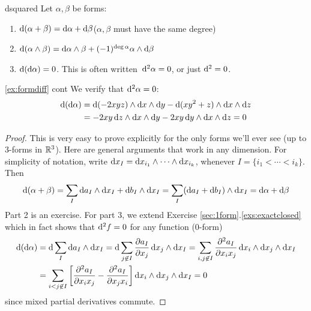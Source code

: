 \begin{thm}{}{dsquared}
	Let $\alpha,\beta$ be forms:
	\begin{enumerate}
	  \item $\D(\alpha+\beta)=\D\alpha+\D\beta$\quad ($\alpha,\beta$ must have the same degree)
	  \item $\D(\alpha\wedge\beta)=\D\alpha\wedge\beta+(-1)^{\deg\alpha}\alpha\wedge\D\beta$
	  \item $\D(\D\alpha)=0$. This is often written\footnotemark\  $\D^2\alpha=0$, or just $\D^2=0$.
	\end{enumerate}
\end{thm}



\goodbreak

\begin{example*}{\ref*{ex:formdiff} cont}{}
	We verify that $\D^2\alpha=0$:
	\begin{align*}
		\D(\D\alpha)&=\D(-2xyz)\wedge\dx\wedge\dy -\D(xy^2+z)\wedge\dx\wedge\dz\\
		&=-2xy\,\dz\wedge\dx\wedge\dy -2xy\,\dy\wedge\dx\wedge\dz =0
	\end{align*}
\end{example*}

\begin{proof}
	This is very easy to prove explicitly for the only forms we'll ever see (up to 3-forms in $\R^3$). Here are general arguments that work in any dimension.\smallbreak
	For simplicity of notation, write $\dx_I=\dx_{i_1}\wedge\dots\wedge\dx_{i_k}$, whenever $I=\{i_1<\cdots<i_k\}$. Then
	\[
		\D(\alpha+\beta)=\sum_I\D a_I\wedge\dx_I+\D b_I\wedge\dx_I =\sum_I(\D a_I+\D b_I)\wedge\dx_I =\D\alpha+\D\beta
	\]
	Part 2 is an exercise. For part 3, we extend Exercise \ref*{sec:1form}.\ref{exs:exactclosed} which in fact shows that $\D^2f=0$ for any function (0-form) 
	\begin{align*}
		\D(\D\alpha)&=\D\sum_I\D a_I\wedge\dx_I =\D\sum_{j\not\in I}\partials[a_I]{x_j}\,\dx_j\wedge\dx_I =\sum_{i,j\not\in I}\partials[^2a_I]{x_ix_j}\,\dx_i\wedge\dx_j\wedge\dx_I \\
		&=\sum_{i<j\not\in I}\left[\partials[^2a_I]{x_ix_j}-\partials[^2a_I]{x_jx_i}\right]\dx_i\wedge\dx_j\wedge\dx_I =0
	\end{align*}
	since mixed partial derivatives commute.
\end{proof}



